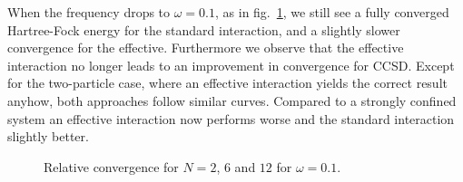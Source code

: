 When the frequency drops to $\omega = 0.1$, as in fig.~\ref{fig:results:convN2OM01}, we still see a fully converged Hartree-Fock energy for the standard interaction, and a slightly slower convergence for the effective.
Furthermore we observe that the effective interaction no longer leads to an improvement in convergence for CCSD.
Except for the two-particle case, where an effective interaction yields the correct result anyhow, both approaches follow similar curves.
Compared to a strongly confined system an effective interaction now performs worse and the standard interaction slightly better.
\begin{figure}
\begin{center}
\caption{Relative convergence for $N=2$, $6$ and $12$ for $\omega =0.1$.}
\label{fig:results:convN2OM01}
\end{center}
\end{figure}


